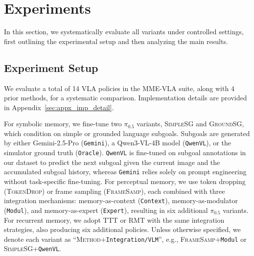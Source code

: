 \section{Experiments}

In this section, we systematically evaluate all \modelname\xspace variants under controlled settings, first outlining the experimental setup and then analyzing the main results.


\subsection{Experiment Setup}
We evaluate a total of 14 VLA policies in the MME-VLA suite, along with 4 prior methods, for a systematic comparison. Implementation details are provided in Appendix~\ref{sec:appx_imp_detail}.

\noindent{\bf \modelname\xspace Suite.}
For symbolic memory, we fine-tune two $\pi_{0.5}$ variants, \textsc{SimpleSG} and \textsc{GroundSG}, which condition on simple or grounded language subgoals. Subgoals are generated by either Gemini-2.5-Pro (\texttt{Gemini}), a Qwen3-VL-4B model (\texttt{QwenVL}), or the simulator ground truth (\texttt{Oracle}).
\texttt{QwenVL} is fine-tuned on subgoal annotations in our dataset to predict the next subgoal given the current image and the accumulated subgoal history, whereas \texttt{Gemini} relies solely on prompt engineering without task-specific fine-tuning.
For perceptual memory, we use token dropping (\textsc{TokenDrop}) or frame sampling (\textsc{FrameSamp}), each combined with three integration mechanisms: memory-as-context (\texttt{Context}), memory-as-modulator (\texttt{Modul}), and memory-as-expert (\texttt{Expert}), resulting in six additional $\pi_{0.5}$ variants.
For recurrent memory, we adopt \textsc{TTT} or \textsc{RMT} with the same integration strategies, also  producing six additional policies.
Unless otherwise specified, we denote each variant as ``\textsc{Method}+\texttt{Integration/VLM}'', e.g., \textsc{FrameSamp}+\texttt{Modul} or \textsc{SimpleSG}+\texttt{QwenVL}.

